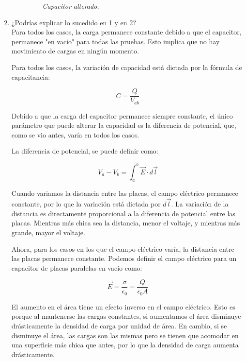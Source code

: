 \documentclass[12pt]{report}
\begin{document}
\begin{enumerate}
\begin{enumerate}
\begin{figure}[h]
\begin{minipage}[h]{0.4\textwidth}
          \textit{Capacitor alterado.} 
       \end{minipage}
      \end{figure}
        
\newpage

    \end{enumerate}
    \item ¿Podrías explicar lo sucedido en 1 y en 2?\\[6pt] 
    Para todos los casos, la carga permanece constante debido a que el capacitor, permanece "en vacío" para todas las pruebas. Esto implica que no hay movimiento de cargas en ningún momento.

    Para todos los casos, la variación de capacidad está dictada por la fórmula de capacitancia:

\[C=\frac{Q}{V_{ab}}\]

    Debido a que la carga del capacitor permanece siempre constante, el único parámetro que puede alterar la capacidad es la diferencia de potencial, que, como se vio antes, varía en todos los casos.
    
    La diferencia de potencial, se puede definir como:
    
\[V_a-V_b=\int_{a}^{b}\vec{E}\cdot d \vec{l}\]

    Cuando variamos la distancia entre las placas, el campo eléctrico permanece constante, por lo que la variación está dictada por \(d \vec{l}\). La variación de la distancia es directamente proporcional a la diferencia de potencial entre las placas. Mientras más chica sea la distancia, menor el voltaje, y mientras más grande, mayor el voltaje.

    Ahora, para los casos en los que el campo eléctrico varía, la distancia entre las placas permanece constante. Podemos definir el campo eléctrico para un capacitor de placas paralelas en vacio como:
    
\[\vec{E}=\frac{\sigma}{\epsilon_0}=\frac{Q}{\epsilon_0 A}\]

    El aumento en el área tiene un efecto inverso en el campo eléctrico. Esto es porque al mantenerse las cargas constantes, si aumentamos el área disminuye drásticamente la densidad de carga por unidad de área. En cambio, si se disminuye el área, las cargas son las mismas pero se tienen que acomodar en una superficie más chica que antes, por lo que la densidad de carga aumenta drásticamente.

\end{enumerate}
\end{document}
